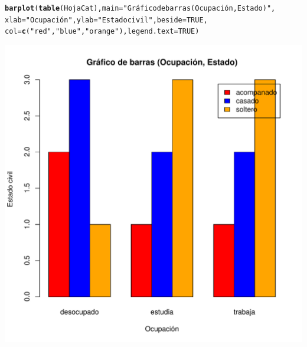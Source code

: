 \documentclass[12pt,letterpaper]{article}\usepackage[]{graphicx}\usepackage[]{color}
\makeatletter
\def\maxwidth{ %
  \ifdim\Gin@nat@width>\linewidth
    \linewidth
  \else
    \Gin@nat@width
  \fi
}
\newcommand{\hlnum}[1]{\textcolor[rgb]{0.686,0.059,0.569}{#1}}%
\newcommand{\hlstr}[1]{\textcolor[rgb]{0.192,0.494,0.8}{#1}}%
\newcommand{\hlstd}[1]{\textcolor[rgb]{0.345,0.345,0.345}{#1}}%
\newcommand{\hlkwc}[1]{\textcolor[rgb]{0.333,0.667,0.333}{#1}}%
\newcommand{\hlkwd}[1]{\textcolor[rgb]{0.737,0.353,0.396}{\textbf{#1}}}%
\newenvironment{kframe}{%
 \def\at@end@of@kframe{}%
 \ifinner\ifhmode%
  \def\at@end@of@kframe{\end{minipage}}%
  \begin{minipage}{\columnwidth}%
 \fi\fi%
 \def\FrameCommand##1{\hskip\@totalleftmargin \hskip-\fboxsep
 \colorbox{shadecolor}{##1}\hskip-\fboxsep
     \hskip-\linewidth \hskip-\@totalleftmargin \hskip\columnwidth}%
 \MakeFramed {\advance\hsize-\width
   \@totalleftmargin\z@ \linewidth\hsize
   \@setminipage}}%
 {\par\unskip\endMakeFramed%
 \at@end@of@kframe}
\newenvironment{knitrout}{}{} %
\makeatother
\begin{document}
\begin{enumerate}
\begin{knitrout}
\color{fgcolor}\begin{kframe}
\begin{alltt}
\hlkwd{barplot}\hlstd{(}\hlkwd{table}\hlstd{(HojaCat),} \hlkwc{main}\hlstd{=}\hlstr{"Gráfico de barras (Ocupación, Estado)"}\hlstd{,}
        \hlkwc{xlab} \hlstd{=} \hlstr{"Ocupación"}\hlstd{,} \hlkwc{ylab}\hlstd{=}\hlstr{"Estado civil"}\hlstd{,} \hlkwc{beside}\hlstd{=}\hlnum{TRUE}\hlstd{,}
        \hlkwc{col}\hlstd{=}\hlkwd{c}\hlstd{(}\hlstr{"red"}\hlstd{,} \hlstr{"blue"}\hlstd{,} \hlstr{"orange"}\hlstd{),}\hlkwc{legend.text}\hlstd{=}\hlnum{TRUE}\hlstd{)}
\end{alltt}
\end{kframe}
\includegraphics[width=\maxwidth]{figure/unnamed-chunk-19-1} 

\end{knitrout}


\end{enumerate}
\end{document}
